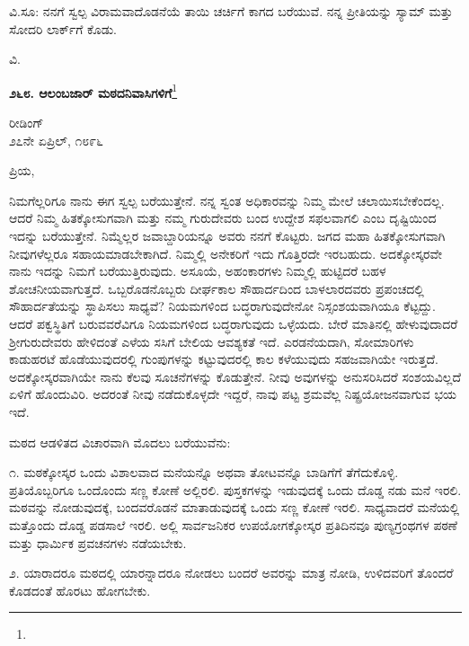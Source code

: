 ವಿ.ಸೂ:\enginline{-} ನನಗೆ ಸ್ವಲ್ಪ ವಿರಾಮವಾದೊಡನೆಯೆ ತಾಯಿ ಚರ್ಚಿಗೆ ಕಾಗದ ಬರೆಯುವೆ. ನನ್ನ ಪ್ರೀತಿಯನ್ನು ಸ್ಯಾಮ್ ಮತ್ತು ಸೋದರಿ ಲಾರ್ಕ್‌ಗೆ ಕೊಡು.

{\flushright
ವಿ.\par}

\begin{center}
\textbf{೨೬೮. ಆಲಂಬಜಾರ್ ಮಠದನಿವಾಸಿಗಳಿಗೆ}\footnote{}
\end{center}

\begin{flushright}
ರೀಡಿಂಗ್\\೨೭ನೇ ಏಪ್ರಿಲ್, ೧೮೯೬
\end{flushright}

\noindent
ಪ್ರಿಯ,

ನಿಮಗೆಲ್ಲರಿಗೂ ನಾನು ಈಗ ಸ್ವಲ್ಪ ಬರೆಯುತ್ತೇನೆ. ನನ್ನ ಸ್ವಂತ ಅಧಿಕಾರವನ್ನು ನಿಮ್ಮ ಮೇಲೆ ಚಲಾಯಿಸಬೇಕೆಂದಲ್ಲ. ಆದರೆ ನಿಮ್ಮ ಹಿತಕ್ಕೋಸುಗವಾಗಿ ಮತ್ತು ನಮ್ಮ ಗುರುದೇವರು ಬಂದ ಉದ್ದೇಶ ಸಫಲವಾಗಲಿ ಎಂಬ ದೃಷ್ಟಿಯಿಂದ ಇದನ್ನು ಬರೆಯುತ್ತೇನೆ. ನಿಮ್ಮೆಲ್ಲರ ಜವಾಬ್ದಾರಿಯನ್ನೂ ಅವರು ನನಗೆ ಕೊಟ್ಟರು. ಜಗದ ಮಹಾ ಹಿತಕ್ಕೋಸುಗವಾಗಿ ನೀವುಗಳೆಲ್ಲರೂ ಸಹಾಯಮಾಡಬೇಕಾಗಿದೆ. ನಿಮ್ಮಲ್ಲಿ ಅನೇಕರಿಗೆ ಇದು ಗೊತ್ತಿರದೇ ಇರಬಹುದು. ಅದಕ್ಕೋಸ್ಕರವೇ ನಾನು ಇದನ್ನು ನಿಮಗೆ ಬರೆಯುತ್ತಿರುವುದು. ಅಸೂಯೆ, ಅಹಂಕಾರಗಳು ನಿಮ್ಮಲ್ಲಿ ಹುಟ್ಟಿದರೆ ಬಹಳ ಶೋಚನೀಯವಾಗುತ್ತದೆ. ಒಬ್ಬರೊಡನೊಬ್ಬರು ದೀರ್ಘಕಾಲ ಸೌಹಾರ್ದದಿಂದ ಬಾಳಲಾರದವರು ಪ್ರಪಂಚದಲ್ಲಿ ಸೌಹಾರ್ದತೆಯನ್ನು ಸ್ಥಾಪಿಸಲು ಸಾಧ್ಯವೆ? ನಿಯಮಗಳಿಂದ ಬದ್ಧರಾಗುವುದೇನೋ ನಿಸ್ಸಂಶಯವಾಗಿಯೂ ಕೆಟ್ಟದ್ದು. ಆದರೆ ಪಕ್ವಸ್ಥಿತಿಗೆ ಬರುವವರೆವಿಗೂ ನಿಯಮಗಳಿಂದ ಬದ್ಧರಾಗುವುದು ಒಳ್ಳೆಯದು. ಬೇರೆ ಮಾತಿನಲ್ಲಿ ಹೇಳುವುದಾದರೆ ಶ‍್ರೀಗುರುದೇವರು ಹೇಳಿದಂತೆ ಎಳೆಯ ಸಸಿಗೆ ಬೇಲಿಯ ಆವಶ್ಯಕತೆ ಇದೆ. ಎರಡನೆಯದಾಗಿ, ಸೋಮಾರಿಗಳು ಕಾಡುಹರಟೆ ಹೊಡೆಯುವುದರಲ್ಲಿ ಗುಂಪುಗಳನ್ನು ಕಟ್ಟುವುದರಲ್ಲಿ ಕಾಲ ಕಳೆಯುವುದು ಸಹಜವಾಗಿಯೇ ಇರುತ್ತದೆ. ಅದಕ್ಕೋಸ್ಕರವಾಗಿಯೇ ನಾನು ಕೆಲವು ಸೂಚನೆಗಳನ್ನು ಕೊಡುತ್ತೇನೆ. ನೀವು ಅವುಗಳನ್ನು ಅನುಸರಿಸಿದರೆ ಸಂಶಯವಿಲ್ಲದೆ ಏಳಿಗೆ ಹೊಂದುವಿರಿ. ಅದರಂತೆ ನೀವು ನಡೆದುಕೊಳ್ಳದೇ ಇದ್ದರೆ, ನಾವು ಪಟ್ಟ ಶ್ರಮವೆಲ್ಲ ನಿಷ್ಪ್ರಯೋಜನವಾಗುವ ಭಯ ಇದೆ.

ಮಠದ ಆಡಳಿತದ ವಿಚಾರವಾಗಿ ಮೊದಲು ಬರೆಯುವೆನು:

೧. ಮಠಕ್ಕೋಸ್ಕರ ಒಂದು ವಿಶಾಲವಾದ ಮನೆಯನ್ನೊ ಅಥವಾ ತೋಟವನ್ನೊ ಬಾಡಿಗೆಗೆ ತೆಗೆದುಕೊಳ್ಳಿ. ಪ್ರತಿಯೊಬ್ಬರಿಗೂ ಒಂದೊಂದು ಸಣ್ಣ ಕೋಣೆ ಅಲ್ಲಿರಲಿ. ಪುಸ್ತಕಗಳನ್ನು ಇಡುವುದಕ್ಕೆ ಒಂದು ದೊಡ್ಡ ನಡು ಮನೆ ಇರಲಿ. ಮಠವನ್ನು ನೋಡುವುದಕ್ಕೆ, ಬಂದವರೊಡನೆ ಮಾತಾಡುವುದಕ್ಕೆ ಒಂದು ಸಣ್ಣ ಕೋಣೆ ಇರಲಿ. ಸಾಧ್ಯವಾದರೆ ಮನೆಯಲ್ಲಿ ಮತ್ತೊಂದು ದೊಡ್ಡ ಪಡಸಾಲೆ ಇರಲಿ. ಅಲ್ಲಿ ಸಾರ್ವಜನಿಕರ ಉಪಯೋಗಕ್ಕೋಸ್ಕರ ಪ್ರತಿದಿನವೂ ಪುಣ್ಯಗ್ರಂಥಗಳ ಪಠಣೆ ಮತ್ತು ಧಾರ್ಮಿಕ ಪ್ರವಚನಗಳು ನಡೆಯಬೇಕು.

\vspace{0.1cm}

೨. ಯಾರಾದರೂ ಮಠದಲ್ಲಿ ಯಾರನ್ನಾದರೂ ನೋಡಲು ಬಂದರೆ ಅವರನ್ನು ಮಾತ್ರ ನೋಡಿ, ಉಳಿದವರಿಗೆ ತೊಂದರೆ ಕೊಡದಂತೆ ಹೊರಟು ಹೋಗಬೇಕು.

\vspace{0.1cm}

